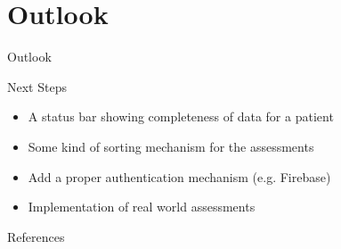 \documentclass{beamer}
\begin{document}
\section{Outlook}%
\label{sec:Outlook}
\begin{frame}{Outlook}
    \begin{block}{Next Steps}
        \begin{itemize}
            \item A status bar showing completeness of data for a patient
            \item Some kind of sorting mechanism for the assessments
            \item Add a proper authentication mechanism (e.g. Firebase)
            \item Implementation of real world assessments
        \end{itemize}
    \end{block}
\end{frame}

\begin{frame}{References} 
    
    
\end{frame}
\end{document}
